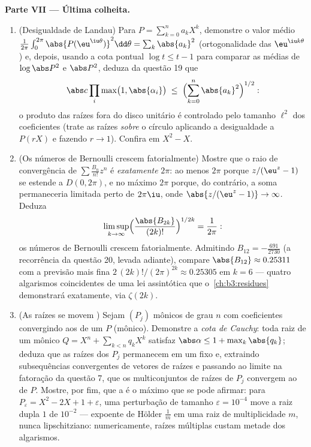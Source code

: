\begin{problem}
\medskip
\noindent\textbf{Parte VII --- Última colheita.}
\begin{enumerate}[resume]
  \item (Desigualdade de Landau) Para $P = \sum_{k=0}^na_kX^k$, demonstre o valor médio
        $\frac1{2\pi}\int_0^{2\pi}
        \abs{P(\eu^{\iu\theta})}^2\dd\theta =
        \sum_k\abs{a_k}^2$ (ortogonalidade das $\eu^{\iu k\theta}$) e, depois, usando a cota
        pontual $\log t \leq t - 1$ para comparar as médias de $\log\abs P^2$ e $\abs P^2$, deduza da
        questão 19 que
        \[
        \abs c\prod_{i}\max\bigl(1, \abs{\alpha_i}\bigr)
        \;\leq\;
        \Bigl(\sum_{k=0}^{n}\abs{a_k}^2\Bigr)^{1/2} :
        \]
        o produto das raízes fora do disco unitário é controlado pelo
        tamanho $\ell^2$ dos coeficientes (trate as raízes
        \emph{sobre} o círculo aplicando a desigualdade a $P(rX)$ e
        fazendo $r \to 1$). Confira em $X^2 - X$.
  \item (Os números de Bernoulli crescem fatorialmente) Mostre que o
        raio de convergência de $\sum\frac{B_n}{n!}z^n$ é \emph{exatamente} $2\pi$: ao
        menos $2\pi$ porque $z/(\eu^z - 1)$ se estende  a
        $D(0, 2\pi)$, e no máximo $2\pi$ porque, do contrário, a soma
        permaneceria limitada perto de $2\pi\iu$, onde $\abs{z/(\eu^z-1)} \to \infty$. Deduza
        \[
        \limsup_{k\to\infty}
        \Bigl(\frac{\abs{B_{2k}}}{(2k)!}\Bigr)^{1/2k}
        = \frac1{2\pi} :
        \]
        os números de Bernoulli crescem fatorialmente. Admitindo $B_{12}
        = -\frac{691}{2730}$
        (a recorrência da questão 20, levada adiante), compare $\abs{B_{12}} \approx 0.25311$ com
        a previsão mais fina $2\,(2k)!/(2\pi)^{2k}
        \approx 0.25305$ em $k = 6$ --- quatro algarismos
        coincidentes de uma lei assintótica que o~\cref{ch:b3:residues}
        demonstrará exatamente, via $\zeta(2k)$.
  \item (As raízes se movem ) Sejam $(P_j)$ mônicos de
        grau $n$ com coeficientes convergindo aos de um $P$
        (mônico). Demonstre a \emph{cota de Cauchy}: toda raiz de um
        mônico $Q = X^n + \sum_{k<n}q_kX^k$ satisfaz $\abs\alpha \leq 1 + \max_k\abs{q_k}$; deduza que as raízes dos $P_j$
        permanecem em um  fixo e, extraindo subsequências
        convergentes de vetores de raízes e passando ao limite na
        fatoração da questão 7, que os multiconjuntos de raízes de
        $P_j$ convergem ao de $P$. Mostre, por fim, que a
         é o máximo que se pode afirmar: para $P_\varepsilon = X^2 - 2X + 1 +
        \varepsilon$, uma
        perturbação de tamanho $\varepsilon =
        10^{-4}$ move a raiz dupla $1$ de $10^{-2}$
        --- expoente de Hölder $\frac1m$ em uma raiz de multiplicidade
        $m$, nunca lipschitziano: numericamente, raízes múltiplas
        custam metade dos algarismos.
\end{enumerate}
\end{problem}
